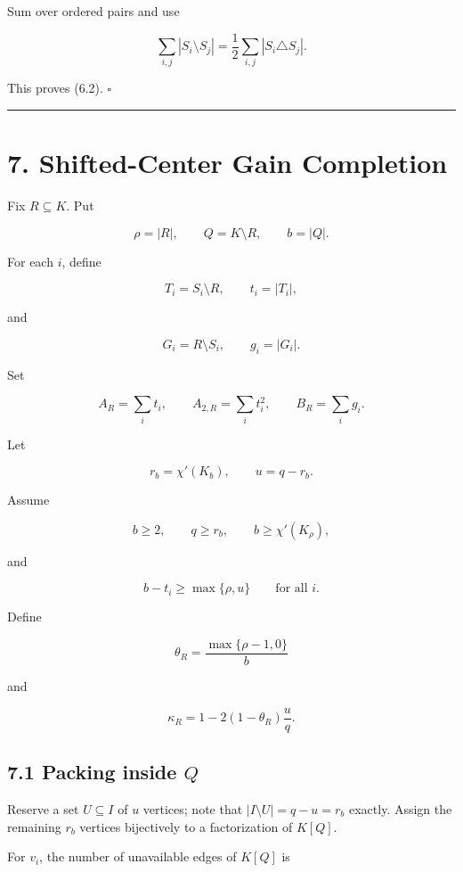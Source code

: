 \documentclass[
  11pt,
]{article}
\begin{document}
Sum over ordered pairs and use

\[
\sum_{i,j}|S_i\setminus S_j|
=
\frac12\sum_{i,j}|S_i\triangle S_j|.
\]

This proves (6.2). \(\square\)

\begin{center}\rule{0.5\linewidth}{0.5pt}\end{center}

\section{7. Shifted-Center Gain Completion}\label{shifted-center-gain-completion}

Fix \(R\subseteq K\). Put

\[
\rho=|R|,
\qquad
Q=K\setminus R,
\qquad
b=|Q|.
\]

For each \(i\), define

\[
T_i=S_i\setminus R,
\qquad
t_i=|T_i|,
\]

and

\[
G_i=R\setminus S_i,
\qquad
g_i=|G_i|.
\]

Set

\[
A_R=\sum_i t_i,
\qquad
A_{2,R}=\sum_i t_i^2,
\qquad
B_R=\sum_i g_i.
\]

Let

\[
r_b=\chi'(K_b),
\qquad
u=q-r_b.
\]

Assume

\[
b\ge2,
\qquad
q\ge r_b,
\qquad
b\ge\chi'(K_\rho),
\tag{7.1}
\]

and

\[
b-t_i\ge\max\{\rho,u\}
\qquad
\text{for all }i.
\tag{7.2}
\]

Define

\[
\theta_R=\frac{\max\{\rho-1,0\}}{b}
\]

and

\[
\kappa_R
=
1-2(1-\theta_R)\frac{u}{q}.
\tag{7.3}
\]

\subsection{\texorpdfstring{7.1 Packing inside \(Q\)}{7.1 Packing inside Q}}\label{packing-inside-q}

Reserve a set \(U\subseteq I\) of \(u\) vertices; note that \(|I\setminus U|=q-u=r_b\) exactly. Assign the remaining \(r_b\) vertices bijectively to a factorization of \(K[Q]\).

For \(v_i\), the number of unavailable edges of \(K[Q]\) is
\end{document}
